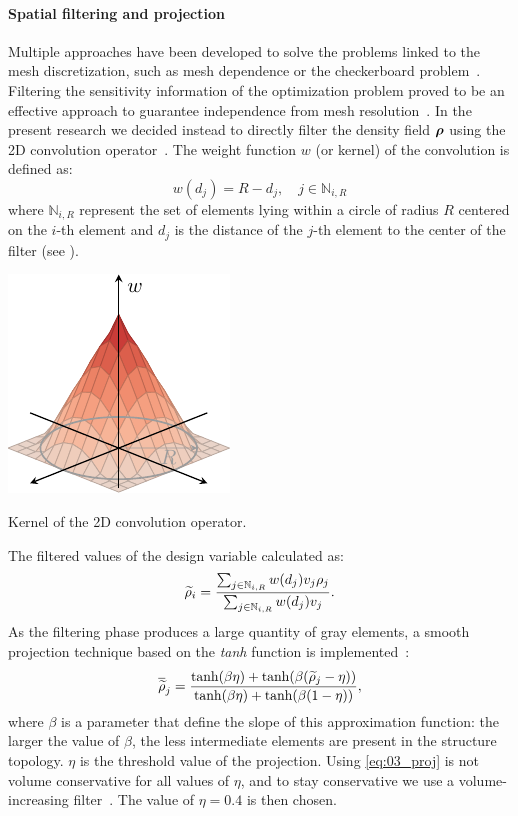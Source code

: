 \paragraph{Spatial filtering and projection}
Multiple approaches have been developed to solve the problems linked to the mesh discretization, such as mesh dependence or the checkerboard problem~. Filtering the sensitivity information of the optimization problem proved to be an effective approach to guarantee independence from mesh resolution~. In the present research we decided instead to directly filter the density field $\bm{\rho}$ using the 2D convolution operator~. The weight function $w$ (or kernel) of the convolution is defined as:
\begin{equation}
    w(d_j) = R - d_j, \quad j \in \mathbb{N}_{i,R}
\end{equation} 
where $\mathbb{N}_{i,R}$ represent the set of elements lying within a circle of radius $R$ centered on the $i$-th element and $d_j$ is the distance of the $j$-th element to the center of the filter (see ).
\begin{marginfigure}
    \centering
    \includegraphics{figures/03_comparison_TO_TTO/01_circ_filter/filt_cir.pdf}
    \caption{Kernel of the 2D convolution operator.}
    \label{fig:03_ker}
\end{marginfigure} 
The filtered values of the design variable calculated as:
\begin{equation}
    \widetilde{\rho}_i = \frac{\sum_{j \in \mathbb{N}_{i,R}} w(d_j)v_j\rho_j}{\sum_{j \in \mathbb{N}_{i,R}} w(d_j)v_j}.
    \label{eq:03_rhofil}
\end{equation}
As the filtering phase produces a large quantity of gray elements, a smooth projection technique based on the \textit{tanh} function is implemented~:
\begin{equation}
    \overline{\widetilde{\rho}}_j = \frac{\tanh(\beta\eta)+\tanh(\beta(\widetilde{\rho}_j - \eta))}{\tanh(\beta\eta)+\tanh(\beta(1 - \eta))},
    \label{eq:03_proj}
\end{equation}
where $\beta$ is a parameter that define the slope of this approximation function: the larger the value of $\beta$, the less intermediate elements are present in the structure topology. $\eta$ is the threshold value of the projection. Using \eqref{eq:03_proj} is not volume conservative for all values of $\eta$, and to stay conservative we use a volume-increasing filter~. The value of $\eta = 0.4$ is then chosen.

